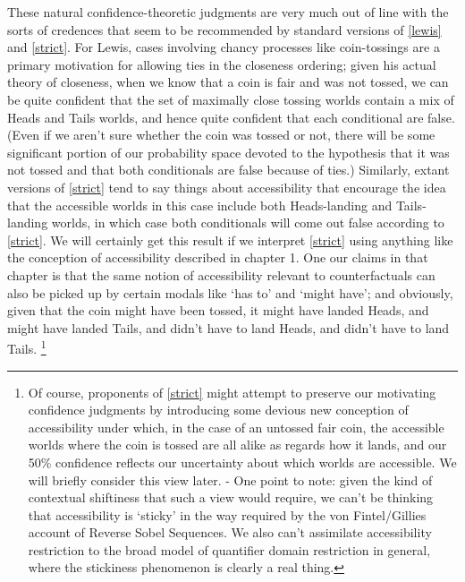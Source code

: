 \documentclass[leqno, 11pt, a5paper, openany]{article}
\begin{document}
These natural confidence-theoretic judgments are very much out of line with the sorts of credences that seem to be recommended by standard versions of \ref{lewis} and \ref{strict}. For Lewis, cases involving chancy processes like coin-tossings are a primary motivation for allowing ties in the closeness ordering; given his actual theory of closeness, when we know that a coin is fair and was not tossed, we can be quite confident that the set of maximally close tossing worlds contain a mix of Heads and Tails worlds, and hence quite confident that each conditional are false. (Even if we aren't sure whether the coin was tossed or not, there will be some significant portion of our probability space devoted to the hypothesis that it was not tossed and that both conditionals are false because of ties.) Similarly, extant versions of \ref{strict} tend to say things about accessibility that encourage the idea that the accessible worlds in this case include both Heads-landing and Tails-landing worlds, in which case both conditionals will come out false according to \ref{strict}. We will certainly get this result if we interpret \ref{strict} using anything like the conception of accessibility described in chapter 1. One our claims in that chapter is that the same notion of accessibility relevant to counterfactuals can also be picked up by certain modals like ‘has to’ and ‘might have’; and obviously, given that the coin might have been tossed, it might have landed Heads, and might have landed Tails, and didn't have to land Heads, and didn't have to land Tails.%
\footnote{Of course, proponents of \ref{strict} might attempt to preserve our motivating confidence judgments by introducing some devious new conception of accessibility under which, in the case of an untossed fair coin, the accessible worlds where the coin is tossed are all alike as regards how it lands, and our 50\% confidence reflects our uncertainty about which worlds are accessible. We will briefly consider this view later. - One point to note: given the kind of contextual shiftiness that such a view would require, we can't be thinking that accessibility is ‘sticky’ in the way required by the von Fintel/Gillies account of Reverse Sobel Sequences. We also can't assimilate accessibility restriction to the broad model of quantifier domain restriction in general, where the stickiness phenomenon is clearly a real thing.}
\end{document}
